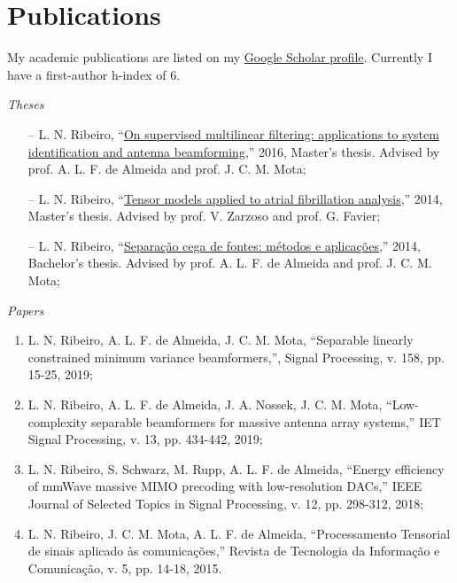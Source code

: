 \section{Publications}

My academic publications are listed on my \href{https://scholar.google.com.br/citations?user=STk6opQAAAAJ}{Google Scholar profile}. Currently I have a first-author h-index of $6$.

{\sl Theses}

\begin{itemize}
	\item[--] L. N. Ribeiro, ``\href{http://www.repositorio.ufc.br/bitstream/riufc/16516/1/2016_dis_lnribeiro.pdf}{On supervised multilinear filtering: applications to system identification and antenna beamforming},'' 2016, Master's thesis. Advised by prof. A. L. F. de Almeida and prof. J. C. M. Mota;
	\item[--] L. N. Ribeiro, ``\href{https://github.com/lnribeiro/lnribeiro.github.io/blob/master/assets/pdf/rapport.pdf}{Tensor models applied to atrial fibrillation analysis},'' 2014, Master's thesis. Advised by prof. V. Zarzoso and prof. G. Favier;
	\item[--] L. N. Ribeiro, ``\href{https://github.com/lnribeiro/lnribeiro.github.io/blob/master/assets/pdf/monografia.pdf}{Separação cega de fontes: métodos e aplicações},'' 2014, Bachelor's thesis. Advised by prof. A. L. F. de Almeida and prof. J. C. M. Mota;
\end{itemize}

{\sl Papers}

\begin{enumerate}
	\item L. N. Ribeiro, A. L. F. de Almeida, J. C. M. Mota, ``Separable linearly constrained minimum variance beamformers,'', Signal Processing, v. 158, pp. 15-25, 2019;
	
	\item L. N. Ribeiro, A. L. F. de Almeida, J. A. Nossek, J. C. M. Mota, ``Low-complexity separable beamformers for massive antenna array systems,'' IET Signal Processing, v. 13, pp. 434-442, 2019;
	
	\item L. N. Ribeiro, S. Schwarz, M. Rupp, A. L. F. de Almeida, ``Energy efficiency of mmWave massive MIMO precoding with low-resolution DACs,'' IEEE Journal of Selected Topics in Signal Processing, v. 12, pp. 298-312, 2018;
	
	\item L. N. Ribeiro, J. C. M. Mota, A. L. F. de Almeida, ``Processamento Tensorial de sinais aplicado às comunicações,'' Revista de Tecnologia da Informação e Comunicação, v. 5, pp. 14-18, 2015.
\end{enumerate}

